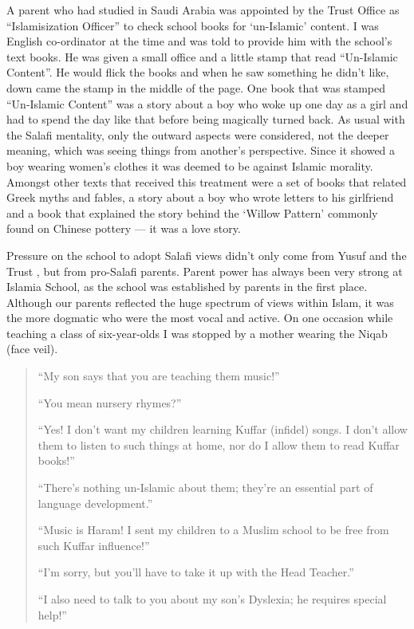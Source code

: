 \documentclass[12pt]{memoir}
\begin{document}
A parent who had studied in Saudi Arabia was appointed
by the Trust Office as “Islamisization Officer”
to check school books for ‘un-Islamic’ content.
I was English co-ordinator at the time
and was told to provide him with the school’s text books.
He was given a small office and a little stamp
that  read “Un-Islamic Content”.
He would flick  the books
and when he saw something he didn’t like,
down came the stamp in the middle of the page.
One book that was stamped “Un-Islamic Content” was a story about a boy
who woke up one day as a girl and had to spend the day like that
before being magically turned back.
As usual with the Salafi mentality,
only the outward aspects were considered, not the deeper meaning,
which was seeing things from another’s perspective.
Since it showed a boy wearing women’s clothes
it was deemed to be against Islamic morality.
Amongst other texts that received this treatment were a set of books
that related Greek myths and fables,
a story about a boy who wrote letters to his girlfriend
and a book that explained the story behind the ‘Willow Pattern’
commonly found on Chinese pottery — it was a love story.

Pressure on the school to adopt Salafi views didn’t only come from Yusuf
and the Trust ,
but from pro-Salafi parents.
Parent power has always been very strong at Islamia School,
as the school was established by parents in the first place.
Although our parents reflected the huge spectrum of views within Islam,
it was the more dogmatic who were the most vocal and active.
On one occasion while teaching a class of six-year-olds
I was stopped by a mother wearing the Niqab (face veil).

\begin{quote}
“My son says that you are teaching them music!”

“You mean nursery rhymes?”

“Yes! I don’t want my children learning Kuffar (infidel) songs.
I don’t allow them to listen to such things at home,
nor do I allow them to read Kuffar books!”

“There’s nothing un-Islamic about them;
they’re an essential part of language development.”

“Music is Haram! I sent my children to a Muslim school
to be free from such Kuffar influence!”

“I’m sorry, but you’ll have to take it up with the Head Teacher.”

“I also need to talk to you about  my son’s Dyslexia;
he requires special help!”
\end{quote}
\end{document}
